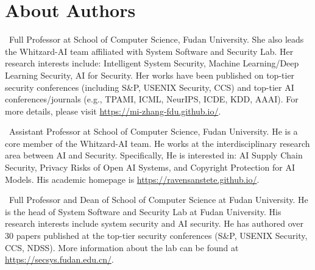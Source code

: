\newpage
\section*{About Authors}

\par\noindent 
\parbox[t]{\linewidth}{
\noindent{}
\ Full Professor at School of Computer Science, Fudan University. She also leads the Whitzard-AI team affiliated with System Software and Security Lab. Her research interests include: Intelligent System Security, Machine Learning/Deep Learning Security, AI for Security. Her works have been published on top-tier security conferences (including S\&P, USENIX Security, CCS) and top-tier AI conferences/journals (e.g., TPAMI, ICML, NeurIPS, ICDE, KDD, AAAI).
For more details, please visit \url{https://mi-zhang-fdu.github.io/}.}
\vspace{1\baselineskip}

\par\noindent 
\parbox[t]{\linewidth}{
\noindent{}
\
Assistant Professor at School of Computer Science, Fudan University. He is a core member of the Whitzard-AI team. He works at the interdisciplinary research area between AI and Security. Specifically, He is interested in: AI Supply Chain Security, Privacy Risks of Open AI Systems, and Copyright Protection for AI Models. His academic homepage is \url{https://ravensanstete.github.io/}.}
\vspace{2\baselineskip}


\par\noindent 
\parbox[t]{\linewidth}{
\noindent{}
\
Full Professor and Dean of School of Computer Science at Fudan University. He is the head of System Software and Security Lab at Fudan University. His research interests include system security and AI security. He has authored over $30$ papers published at the top-tier security conferences (S\&P, USENIX Security, CCS, NDSS). More information about the lab can be found at \url{https://secsys.fudan.edu.cn/}.}  
\vspace{8\baselineskip}